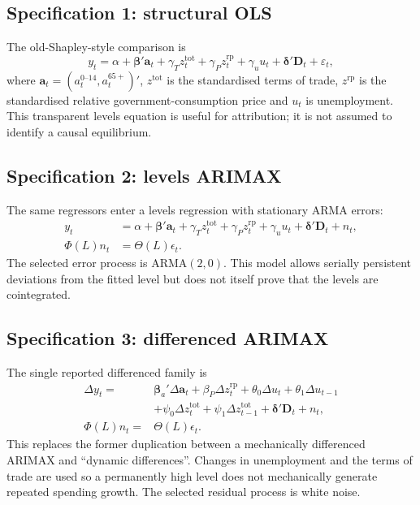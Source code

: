 \documentclass[11pt,a4paper]{article}
\begin{document}
\subsection{Specification 1: structural OLS}

The old-Shapley-style comparison is
\begin{equation}
y_t=\alpha+\boldsymbol\beta'\mathbf a_t+\gamma_T z_t^{\mathrm{tot}}
+\gamma_P z_t^{\mathrm{rp}}+\gamma_u u_t+\boldsymbol\delta'\mathbf D_t+\varepsilon_t,
\end{equation}
where $\mathbf a_t=(a_t^{0\text{--}14},a_t^{65+})'$, $z^{\mathrm{tot}}$ is the standardised terms of trade, $z^{\mathrm{rp}}$ is the standardised relative government-consumption price and $u_t$ is unemployment. This transparent levels equation is useful for attribution; it is not assumed to identify a causal equilibrium.

\subsection{Specification 2: levels ARIMAX}

The same regressors enter a levels regression with stationary ARMA errors:
\begin{align}
y_t&=\alpha+\boldsymbol\beta'\mathbf a_t+\gamma_T z_t^{\mathrm{tot}}
+\gamma_P z_t^{\mathrm{rp}}+\gamma_u u_t+\boldsymbol\delta'\mathbf D_t+n_t,\\
\Phi(L)n_t&=\Theta(L)\epsilon_t.
\end{align}
The selected error process is ARMA$(2,0)$. This model allows serially persistent deviations from the fitted level but does not itself prove that the levels are cointegrated.

\subsection{Specification 3: differenced ARIMAX}

The single reported differenced family is
\begin{align}
\Delta y_t={}&\boldsymbol\beta_a'\Delta\mathbf a_t+\beta_P\Delta z_t^{\mathrm{rp}}
+\theta_0\Delta u_t+\theta_1\Delta u_{t-1}\\
&+\psi_0\Delta z_t^{\mathrm{tot}}+\psi_1\Delta z_{t-1}^{\mathrm{tot}}
+\boldsymbol\delta'\mathbf D_t+n_t,\\
\Phi(L)n_t={}&\Theta(L)\epsilon_t.
\end{align}
This replaces the former duplication between a mechanically differenced ARIMAX and ``dynamic differences''. Changes in unemployment and the terms of trade are used so a permanently high level does not mechanically generate repeated spending growth. The selected residual process is white noise.
\end{document}
